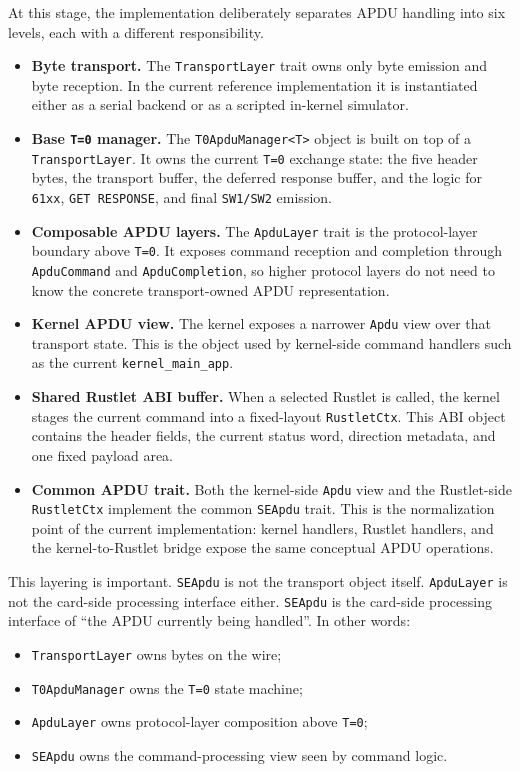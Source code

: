 At this stage, the implementation deliberately separates APDU handling
into six levels, each with a different responsibility.

\begin{itemize}
\item \textbf{Byte transport.} The \texttt{TransportLayer} trait owns
  only byte emission and byte reception. In the current reference
  implementation it is instantiated either as a serial backend or as a
  scripted in-kernel simulator.
\item \textbf{Base \texttt{T=0} manager.} The
  \texttt{T0ApduManager<T>} object is built on top of a
  \texttt{TransportLayer}. It owns the current \texttt{T=0} exchange
  state: the five header bytes, the transport buffer, the deferred
  response buffer, and the logic for \texttt{61xx},
  \texttt{GET RESPONSE}, and final \texttt{SW1/SW2} emission.
\item \textbf{Composable APDU layers.} The \texttt{ApduLayer} trait is
  the protocol-layer boundary above \texttt{T=0}. It exposes command
  reception and completion through \texttt{ApduCommand} and
  \texttt{ApduCompletion}, so higher protocol layers do not need to
  know the concrete transport-owned APDU representation.
\item \textbf{Kernel APDU view.} The kernel exposes a narrower
  \texttt{Apdu} view over that transport state. This is the object used
  by kernel-side command handlers such as the current
  \texttt{kernel\_main\_app}.
\item \textbf{Shared Rustlet ABI buffer.} When a selected Rustlet is
  called, the kernel stages the current command into a fixed-layout
  \texttt{RustletCtx}. This ABI object contains the header fields, the
  current status word, direction metadata, and one fixed payload area.
\item \textbf{Common APDU trait.} Both the kernel-side \texttt{Apdu}
  view and the Rustlet-side \texttt{RustletCtx} implement the common
  \texttt{SEApdu} trait. This is the normalization point of the current
  implementation: kernel handlers, Rustlet handlers, and the
  kernel-to-Rustlet bridge expose the same conceptual APDU operations.
\end{itemize}

This layering is important. \texttt{SEApdu} is not the transport object
itself. \texttt{ApduLayer} is not the card-side processing interface
either. \texttt{SEApdu} is the card-side processing interface of ``the
APDU currently being handled''. In other words:
\begin{itemize}
\item \texttt{TransportLayer} owns bytes on the wire;
\item \texttt{T0ApduManager} owns the \texttt{T=0} state machine;
\item \texttt{ApduLayer} owns protocol-layer composition above
  \texttt{T=0};
\item \texttt{SEApdu} owns the command-processing view seen by command
  logic.
\end{itemize}

